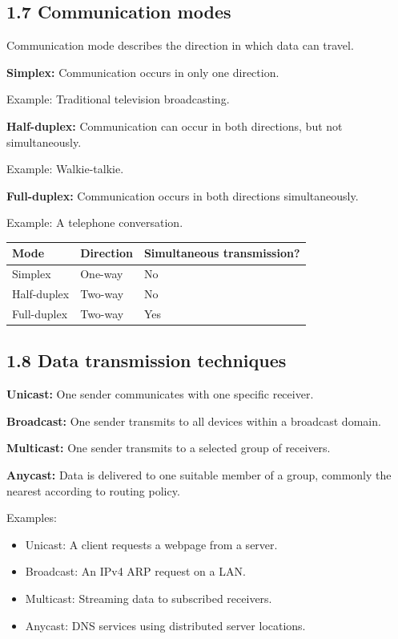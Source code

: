 \subsection{1.7 Communication modes}

Communication mode describes the direction in which data can travel.

\textbf{Simplex:} Communication occurs in only one direction.

Example: Traditional television broadcasting.

\textbf{Half-duplex:} Communication can occur in both directions, but not simultaneously.

Example: Walkie-talkie.

\textbf{Full-duplex:} Communication occurs in both directions simultaneously.

Example: A telephone conversation.

\begin{table}[htbp]
\centering
\begin{tabularx}{\textwidth}{p{3.2cm} X X}
\toprule
\textbf{Mode} & \textbf{Direction} & \textbf{Simultaneous transmission?} \\
\midrule
Simplex & One-way & No \\
Half-duplex & Two-way & No \\
Full-duplex & Two-way & Yes \\
\bottomrule
\end{tabularx}
\end{table}

\subsection{1.8 Data transmission techniques}

\textbf{Unicast:} One sender communicates with one specific receiver.

\textbf{Broadcast:} One sender transmits to all devices within a broadcast domain.

\textbf{Multicast:} One sender transmits to a selected group of receivers.

\textbf{Anycast:} Data is delivered to one suitable member of a group, commonly the nearest according to routing policy.

Examples:

\begin{itemize}
    \item Unicast: A client requests a webpage from a server.
    \item Broadcast: An IPv4 ARP request on a LAN.
    \item Multicast: Streaming data to subscribed receivers.
    \item Anycast: DNS services using distributed server locations.
\end{itemize}

